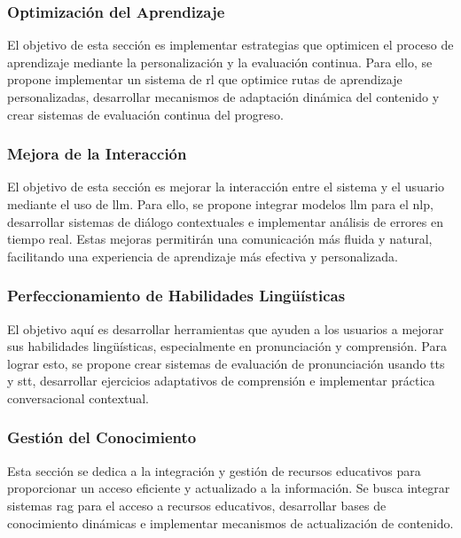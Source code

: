 \subsubsection{Optimización del Aprendizaje}
El objetivo de esta sección es implementar estrategias que optimicen el proceso de aprendizaje mediante la personalización y la evaluación continua. Para ello, se propone implementar un sistema de \gls{rl} que optimice rutas de aprendizaje personalizadas, desarrollar mecanismos de adaptación dinámica del contenido y crear sistemas de evaluación continua del progreso.

\subsubsection{Mejora de la Interacción}
El objetivo de esta sección es mejorar la interacción entre el sistema y el usuario mediante el uso de \gls{llm}. Para ello, se propone integrar modelos \gls{llm} para el \gls{nlp}, desarrollar sistemas de diálogo contextuales e implementar análisis de errores en tiempo real. Estas mejoras permitirán una comunicación más fluida y natural, facilitando una experiencia de aprendizaje más efectiva y personalizada.

\subsubsection{Perfeccionamiento de Habilidades Lingüísticas}
El objetivo aquí es desarrollar herramientas que ayuden a los usuarios a mejorar sus habilidades lingüísticas, especialmente en pronunciación y comprensión. Para lograr esto, se propone crear sistemas de evaluación de pronunciación usando \gls{tts} y \gls{stt}, desarrollar ejercicios adaptativos de comprensión e implementar práctica conversacional contextual.

\subsubsection{Gestión del Conocimiento}
Esta sección se dedica a la integración y gestión de recursos educativos para proporcionar un acceso eficiente y actualizado a la información. Se busca integrar sistemas \gls{rag} para el acceso a recursos educativos, desarrollar bases de conocimiento dinámicas e implementar mecanismos de actualización de contenido.
